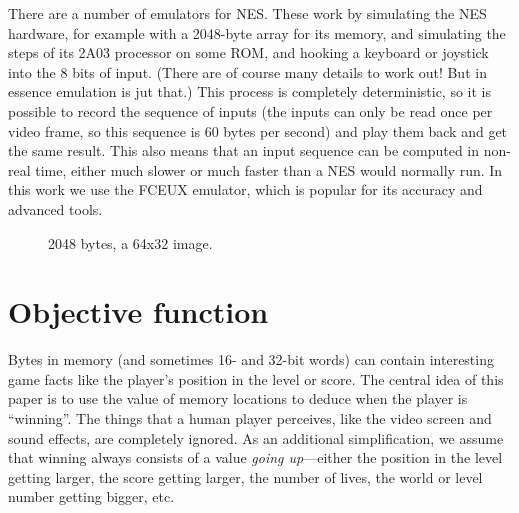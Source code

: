 \documentclass[twocolumn]{article}
\begin{document}
There are a number of emulators for NES. These work by simulating the NES hardware, for example with a 2048-byte array for its memory, and simulating the steps of its 2A03 processor on some ROM, and hooking a keyboard or joystick into the 8 bits of input. (There are of course many details to work out! But in essence emulation is jut that.) This process is completely deterministic, so it is possible to record the sequence of inputs (the inputs can only be read once per video frame, so this sequence is 60  bytes per second) and play them back and get the same result. This also means that an input sequence can be computed in non-real time, either much slower or much faster than a NES would normally run. In this work we use the FCEUX emulator, which is popular for its accuracy and advanced tools.

\begin{figure}
\begin{center}
\end{center}\vspace{-0.1in}
\caption{2048 bytes, a 64x32 image.}
\label{fig:bytes2048}
\end{figure}

\section{Objective function}

Bytes in memory (and sometimes 16- and 32-bit words) can contain interesting game facts like the player's position in the level or score. The central idea of this paper is to use the value of memory locations to deduce when the player is ``winning''. The things that a human player perceives, like the video screen and sound effects, are completely ignored. As an additional simplification, we assume that winning always consists of a value {\it going up}---either the position in the level getting larger, the score getting larger, the number of lives, the world or level number getting bigger, etc.
\end{document}
